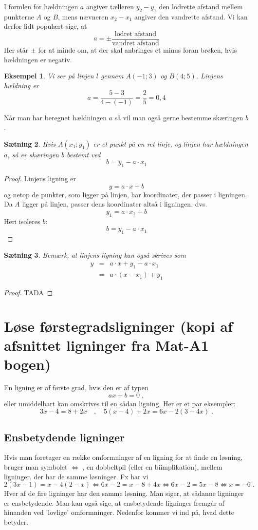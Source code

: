 \documentclass[12pt,oneside,a4paper]{article}
\newcommand{\bas}{\begin{eqnarray*}}
\newcommand{\eas}{\end{eqnarray*}}
\newtheorem{thm}{Sætning}[section]
\newtheorem{eks}[thm]{Eksempel}
\begin{document}
I formlen for hældningen $a$ angiver tælleren $y_2-y_1$ den lodrette afstand
mellem punkterne $A$ og $B$, mens nævneren $x_2-x_1$ angiver den vandrette
afstand. Vi kan derfor lidt populært sige, at
$$
a = \pm \frac{\mbox{lodret afstand}}{\mbox{vandret afstand}}
$$
Her står $\pm$ for at minde om, at der skal anbringes et minus foran brøken,
hvis hældningen er negativ.
\begin{eks}
    Vi ser på linjen $l$ gennem $A(-1; 3)$ og $B(4; 5)$.
    Linjens hældning er
    $$
    a = \frac{5-3}{4-(-1)} = \frac{2}{5} = 0,4
    $$
\end{eks}

Når man har beregnet hældningen $a$ så vil man også gerne bestemme skæringen
$b$.
\begin{thm}
    Hvis $A(x_1; y_1)$ er et punkt på en ret linje, og linjen har hældningen
    $a$, så er skæringen $b$ bestemt ved
    $$
    b = y_1 - a\cdot x_1
    $$
\end{thm}
\begin{proof}
    Linjens ligning er 
    $$
    y = a\cdot x + b
    $$
    og netop de punkter, som ligger på linjen, har koordinater, der passer i
    ligningen.  Da $A$ ligger på linjen, passer dens koordinater altså i
    ligningen, dvs.
    $$
    y_1 = a\cdot x_1 + b 
    $$
    Heri isoleres $b$:
    $$
    b = y_1 - a\cdot x_1
    $$
\end{proof}

\begin{thm}
Bemærk, at linjens ligning kan også skrives som
\bas
y &=& a\cdot x + y_1 - a\cdot x_1 \\
  &=& a\cdot (x-x_1) + y_1 
\eas
\end{thm}
\begin{proof}
    TADA
\end{proof}


\section{Løse førstegradsligninger (kopi af afsnittet ligninger fra Mat-A1 bogen)}
En ligning er af første grad, hvis den er af typen
$$
ax + b = 0\; ,
$$
eller umiddelbart kan omskrives til en sådan ligning. Her er et par eksempler:
$$
3x - 4 = 8 + 2x \quad , \quad 5(x - 4) + 2x = 6x - 2(3 - 4x)\; .
$$

\subsection{Ensbetydende ligninger}
Hvis man foretager en række omformninger af en ligning for at finde en løsning,
bruger man symbolet $\iff$ , en dobbeltpil (eller en biimplikation), mellem
ligninger, der har de samme løsninger. Fx har vi
$$
2(3x - 1) = x - 4(2 - x)\iff 6x - 2 = x - 8 + 4x\iff
6x - 2 = 5x - 8 \iff x = -6 \; .
$$
Hver af de fire ligninger har den samme løsning. Man siger, at sådanne
ligninger er ensbetydende. Man kan også sige, at ensbetydende ligninger fremgår
af hinanden ved ’lovlige’ omformninger. Nedenfor kommer vi ind på, hvad dette
betyder.
\end{document}
